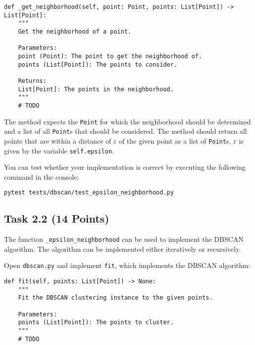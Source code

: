 \documentclass[
english,
smallborders
]{i6prcsht}
\newcommand{\points}[1]{\hfill \color{red}(#1 Points)\color{black}}
\begin{document}
\vspace*{0.3cm}

\begin{lstlisting}
def _get_neighborhood(self, point: Point, points: List[Point]) -> List[Point]:
	"""
	Get the neighborhood of a point.

	Parameters:
	point (Point): The point to get the neighborhood of.
	points (List[Point]): The points to consider.

	Returns:
	List[Point]: The points in the neighborhood.
	"""
	# TODO
\end{lstlisting}

\vspace*{0.1cm}

The method expects the \texttt{Point} for which the neighborhood should be determined and a list of all \texttt{Point}s that should be considered. The method should return all points that are within a distance of $\varepsilon$ of the given point as a list of \texttt{Point}s. $\varepsilon$ is given by the variable \texttt{self.epsilon}.

You can test whether your implementation is correct by executing the following command in the console:

\vspace*{0.3cm}

\begin{lstlisting}
pytest tests/dbscan/test_epsilon_neighborhood.py
\end{lstlisting}

\vspace*{0.1cm}

\subsection*{Task 2.2 \points{14}}

The function \texttt{\_epsilon\_neighborhood} can be used to implement the DBSCAN algorithm. The algorithm can be implemented either iteratively or recursively.

Open \texttt{dbscan.py} and implement \texttt{fit}, which implements the DBSCAN algorithm:

\vspace*{0.3cm}

\begin{lstlisting}
def fit(self, points: List[Point]) -> None:
	"""
	Fit the DBSCAN clustering instance to the given points.

	Parameters:
	points (List[Point]): The points to cluster.
	"""
	# TODO
\end{lstlisting}
\end{document}
